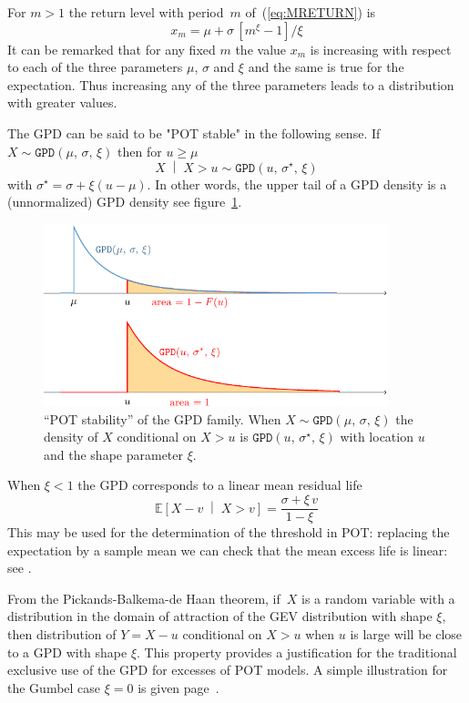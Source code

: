 \documentclass[a4paper]{report}
\newcommand{\Esp}{\mathbb{E}}
\newcommand{\bCond}[2]{\left[ #1 \;\middle\vert\; #2 \right]}
\newcommand{\Cond}[2]{\left. #1 \;\middle\vert\; #2 \right.}
\begin{document}
For $m>1$ the return level with period~$m$ of~(\ref{eq:MRETURN}) is
$$ 
    x_m = \mu + \sigma \,\left[m^\xi - 1\right]/\xi  
$$
It can be remarked that for any fixed $m$ the value $x_m$ is increasing
with respect to each of the three parameters $\mu$, $\sigma$ and $\xi$
and the same is true for the expectation. Thus increasing any of the three 
parameters leads to a distribution with greater values.

The GPD can be said to be "POT stable" in the following sense. 
If $X \sim\texttt{GPD}(\mu,\,\sigma,\,\xi)$ then for $u \geqslant \mu$
$$
    \Cond{X}{X > u} \sim \texttt{GPD}(u,\,\sigma^\star,\,\xi)
$$
with $\sigma^\star = \sigma + \xi (u-\mu)$. In other words, the upper tail of a GPD density
is a (unnormalized) GPD density see figure~\ref{STABEX}.

\begin{figure}
  \centering
  \includegraphics[width=10cm]{images/StableGPD.pdf}
  \caption{\label{STABEX} ``POT stability'' of the GPD family. When 
    $X \sim \texttt{GPD}(\mu,\,\sigma,\,\xi)$ the density of $X$ conditional
    on $X >u$ is $\texttt{GPD}(u,\,\sigma^\star,\,\xi)$ 
    with location $u$ and the shape parameter $\xi$.
  }
\end{figure}


When $\xi < 1$ the GPD corresponds to a linear mean residual life 
%
$$
    \Esp\bCond{X - v}{X > v}  = \frac{ \sigma + \xi \,v }{1 -\xi }
$$ 
This may be used for the determination of the threshold in POT:
replacing the expectation by a sample mean we can check that the 
mean excess life is linear: see \citet[chap.~4]{COLES}.

From the Pickands-Balkema-de Haan theorem, if~$X$ is a random variable
with a distribution in the domain of attraction of the GEV distribution
with shape $\xi$, then distribution of $Y=X-u$ conditional on $X >u$ when $u$
is large will be close to a GPD with shape $\xi$.
This property provides a justification for the traditional exclusive
use of the GPD for excesses of POT models. A simple illustration for
the Gumbel case $\xi = 0$ is given page~\pageref{GUMBEXP}.
\end{document}
